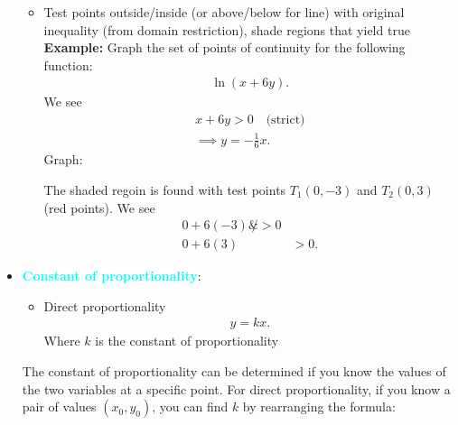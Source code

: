 \documentclass{report}
\begin{document}
\begin{itemize}
\begin{itemize}
                    \item Test points outside/inside (or above/below for line) with original inequality (from domain restriction), shade regions that yield true
                        \bigbreak \noindent 
                        \textbf{Example:} Graph the set of points of continuity for the following function:
                        \begin{align*}
                            \ln{(x+6y)}
                        .\end{align*}
                        We see 
                        \begin{align*}
                            x+6y > 0  \quad \text{(strict)}\\
                            \implies y = -\frac{1}{6}x
                        .\end{align*}
                        Graph:
                    \begin{figure}[ht]
                        \centering
                        \label{fig:graphermane1233}
                    \end{figure}
                    \bigbreak \noindent 
                    The shaded regoin is found with test points $T_{1}(0,-3)$ and $T_{2}(0,3)$ (red points). We see
                    \begin{align*}
                        0 + 6(-3) \not&> 0 \\
                        0 + 6(3) &> 0 
                    .\end{align*}
                \end{itemize}
            \item \textbf{\textcolor{cyan}{Constant of proportionality}}:
                \begin{itemize}
                    \item Direct proportionality
                        \begin{align*}
                            y = kx
                        .\end{align*}
                        Where $k$ is the constant of proportionality
                \end{itemize}
                The constant of proportionality can be determined if you know the values of the two variables at a specific point. For direct proportionality, if you know a pair of values $(x_{0}, y_{0}) $, you can find  $k$ by rearranging the formula:
                \begin{align*}

\end{align*}
\end{itemize}
\end{document}
